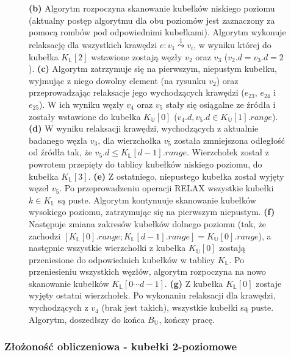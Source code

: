 \begin{figure}[!htbp]
	\caption{ \textbf{(b)} Algorytm rozpoczyna skanowanie kubełków niskiego poziomu (aktualny postęp algorytmu dla obu poziomów jest zaznaczony za pomocą rombów pod odpowiednimi kubełkami). Algorytm wykonuje relaksację dla wszystkich krawędzi $e : v_{1} \overset{1}\leadsto v_{i}$, w wyniku której do kubełka $K_{\mathbb{L}} \left[ 2\right]$ wstawione zostają węzły $v_{2}$ oraz $v_{3}$ ($v_{2}.d = v_{3}.d = 2$). \textbf{(c)} Algorytm zatrzymuje się na pierwszym, niepustym kubełku, wyjmując z niego dowolny element (na rysunku $v_{2}$) oraz przeprowadzając relaksacje jego wychodzących krawędzi ($e_{23}$, $e_{24}$ i $e_{25}$). W ich wyniku węzły $v_{4}$ oraz $v_{5}$ stały się osiągalne ze źródła i zostały wstawione do kubełka $K_{\mathbb{U}} \left[ 0 \right]$ ($v_{4}.d, v_{5}.d \in K_{\mathbb{U}} \left[ 1 \right].range$). \textbf{(d)} W wyniku relaksacji krawędzi, wychodzących z aktualnie badanego węzła $v_{3}$, dla wierzchołka $v_{5}$ została zmniejszona odległość od źródła tak, że $v_{5}.d \leqslant K_{\mathbb{L}} \left[ d - 1 \right].range$. Wierzchołek został z powrotem przepięty do tablicy kubełków niskiego poziomu, do kubełka $K_{\mathbb{L}} \left[ 3 \right]$. \textbf{(e)} Z ostatniego, niepustego kubełka został wyjęty węzeł $v_{5}$. Po przeprowadzeniu operacji \textsc{RELAX} wszystkie kubełki $k \in K_{\mathbb{L}}$ są puste. Algorytm kontynuuje skanowanie kubełków wysokiego poziomu, zatrzymując się na pierwszym niepustym. \textbf{(f)} Następuje zmiana zakresów kubełków dolnego poziomu (tak, że zachodzi $ \left[ K_{\mathbb{L}} \left[ 0 \right].range ; K_{\mathbb{L}} \left[ d - 1 \right].range \right] = K_{\mathbb{U}} \left[ 0 \right].range$), a następnie wszystkie wierzchołki z kubełka $K_{\mathbb{U}} \left[ 0 \right]$ zostają przeniesione do odpowiednich kubełków w tablicy $K_{\mathbb{L}}$. Po przeniesieniu wszystkich węzłów, algorytm rozpoczyna na nowo skanowanie kubełków $K_{\mathbb{L}} \left[ 0 \cdots d-1 \right]$. \textbf{(g)} Z kubełka $K_{\mathbb{L}} \left[ 0 \right]$ zostaje wyjęty ostatni wierzchołek. Po wykonaniu relaksacji dla krawędzi, wychodzących z $v_{4}$ (brak jest takich), wszystkie kubełki są puste. Algorytm, doszedłszy do końca $B_{\mathbb{U}}$, kończy pracę.} \label{fig:exampleDoubleLevelBuckets2}
\end{figure}

\subsubsection{Złożoność obliczeniowa - kubełki 2-poziomowe}

